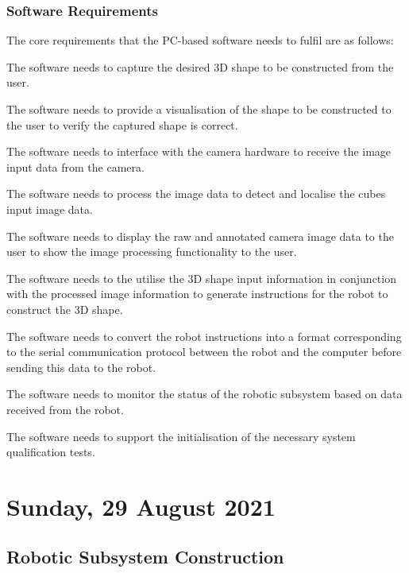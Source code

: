 \subsubsection{Software Requirements}

The core requirements that the PC-based software needs to fulfil are as follows:

\begin{compactitem}
	\item The software needs to capture the desired 3D shape to be constructed from the user.
	\item The software needs to provide a visualisation of the shape to be constructed to the user to verify the captured shape is correct.
	\item The software needs to interface with the camera hardware to receive the image input data from the camera.
	\item The software needs to process the image data to detect and localise the cubes input image data.
	\item The software needs to display the raw and annotated camera image data to the user to show the image processing functionality to the user.
	\item The software needs to the utilise the 3D shape input information in conjunction with the processed image information to generate instructions for the robot to construct the 3D shape.
	\item The software needs to convert the robot instructions into a format corresponding to the serial communication protocol between the robot and the computer before sending this data to the robot.
	\item The software needs to monitor the status of the robotic subsystem based on data received from the robot.
	\item The software needs to support the initialisation of the necessary system qualification tests.
\end{compactitem}

\pendsign

\section[2021/08/29]{Sunday, 29 August 2021}

\subsection{Robotic Subsystem Construction}

